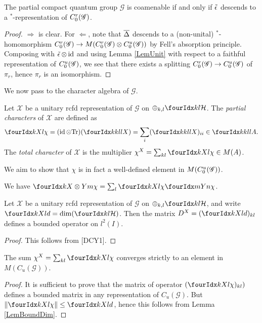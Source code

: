 \begin{Cor} The partial compact quantum group $\mathscr{G}$ is coamenable if and only if $\operatorname{\tilde{\epsilon}}$ descends to a $^*$-representation of $C^{r}_{0}(\mathscr{G})$.
\end{Cor} 
\begin{proof} $\Rightarrow$ is clear. For $\Leftarrow$, note that $\overline{\Delta}$ descends to a (non-unital) $^*$-homomorphism $C^{r}_{0}(\mathscr{G})\rightarrow M(C^{r}_{0}(\mathscr{G})\otimes C^{u}_{0}(\mathscr{G}))$ by Fell's absorption principle. Composing with $\operatorname{\tilde{\epsilon}}\otimes \operatorname{id}$ and using Lemma \ref{LemUnit} with respect to a faithful representation of $C^{u}_{0}(\mathscr{G})$, we see that there exists a splitting $C^{r}_{0}(\mathscr{G})\rightarrow C^{u}_{0}(\mathscr{G})$ of $\pi_r$, hence $\pi_r$ is an isomorphism.
\end{proof}
 
 We now pass to the character algebra of $\mathscr{G}$.
 
 \begin{Def} Let $\mathscr{X}$ be a unitary rcfd representation of $\mathscr{G}$ on $\oplus_{k,l} \Gru{\Hsp}{k}{l}$. The \emph{partial characters} of $\mathscr{X}$ are defined as \[\Gr{\chi}{}{X}{k}{l} = (\id\otimes \Tr)(\Gr{X}{k}{l}{k}{l}) = \sum_i(\Gr{X}{k}{l}{k}{l})_{ii} \in \Gr{A}{k}{l}{k}{l}.\]
 The \emph{total character} of $\mathscr{X}$ is the multiplier $\chi^X  =\sum_{kl} \Gr{\chi}{}{X}{k}{l}\in M(A)$.
 \end{Def}
 
 We aim to show that $\chi$ is in fact a well-defined element in $M(C^{u}_{0}(\mathscr{G}))$. 
 
 \begin{Lem}\label{LemBoundDim} We have $\Gr{\chi}{}{X\otimes Y}{k}{m}= \sum_l \Gr{\chi}{}{X}{k}{l}\Gr{\chi}{}{Y}{m}{n}$.
 \end{Lem}
 
 \begin{Lem} Let $\mathscr{X}$ be a unitary rcfd representation of $\mathscr{G}$ on $\oplus_{k,l} \Gru{\Hsp}{k}{l}$, and write $\Gr{d}{}{X}{k}{l} = \dim(\Gru{\Hsp}{k}{l})$. Then the matrix $D^X = (\Gr{d}{}{X}{k}{l})_{kl}$ defines a bounded operator on $l^2(I)$. 
  \end{Lem}
  \begin{proof} This follows from [DCY1].
   \end{proof} 
   
\begin{Cor} The sum $\chi^X  =\sum_{kl} \Gr{\chi}{}{X}{k}{l}$ converges strictly to an element in $M(C_u(\mathscr{G}))$. 
\end{Cor} 
 
\begin{proof} It is sufficient to prove that the matrix of operator $(\Gr{\chi}{}{X}{k}{l})_{kl})$ defines a bounded matrix in any representation of $C_u(\mathscr{G})$. But $\| \Gr{\chi}{}{X}{k}{l}\| \leq \Gr{d}{}{X}{k}{l}$, hence this follows from Lemma \ref{LemBoundDim}.
\end{proof} 
 
